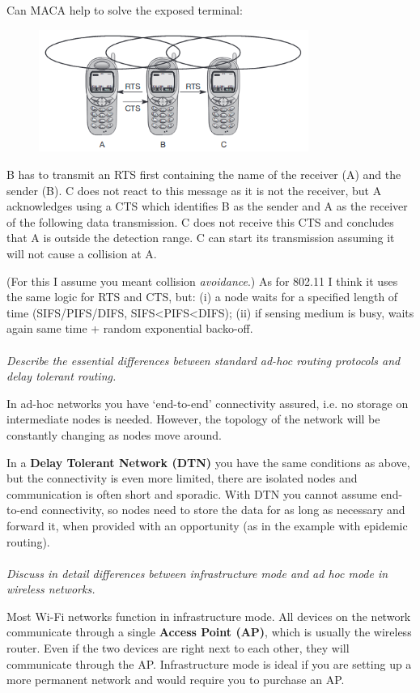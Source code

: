 \documentclass[12pt]{article}
\newcommand*\circled[1]{\tikz[baseline=(char.base)]{
		\node[shape=circle,draw,inner sep=0pt] (char) {#1};}}
\begin{document}
Can MACA help to solve the exposed terminal:
\begin{figure}[H]
    \centering
    \includegraphics[width=250pt]{exposed_terminal.png}
\end{figure}
B has to transmit an RTS first containing the name of the receiver (A) and the
sender (B). C does not react to this message as it is not the receiver, but
A acknowledges using a CTS which identifies B as the sender and A as the
receiver of the following data transmission. C does not receive this CTS and
concludes that A is outside the detection range. C can start its transmission
assuming it will not cause a collision at A.

(For this I assume you meant collision \emph{avoidance}.) As for 802.11 I think
it uses the same logic for RTS and CTS, but: (i) a node waits for a specified
length of time (SIFS/PIFS/DIFS, SIFS<PIFS<DIFS); (ii) if sensing medium is
busy, waits again same time + random exponential backo-off.
\\
\\
\textit{\circled{3.} Describe the essential differences between standard ad-hoc
routing protocols and delay tolerant routing.}

In ad-hoc networks you have `end-to-end' connectivity assured, i.e. no storage
on intermediate nodes is needed. However, the topology of the network will be
constantly changing as nodes move around.

In a \textbf{Delay Tolerant Network (DTN)} you have the same conditions as
above, but the connectivity is even more limited, there are isolated nodes and
communication is often short and sporadic. With DTN you cannot assume
end-to-end connectivity, so nodes need to store the data for as long as
necessary and forward it, when provided with an opportunity (as in the example
with epidemic routing).
\\
\\
\textit{\circled{4.} Discuss in detail differences between infrastructure mode
and ad hoc mode in wireless networks.}

Most Wi-Fi networks function in infrastructure mode. All devices on the network
communicate through a single \textbf{Access Point (AP)}, which is usually the
wireless router. Even if the two devices are right next to each other, they
will communicate through the AP. Infrastructure mode is ideal if you are
setting up a more permanent network and would require you to purchase an AP.
\end{document}
